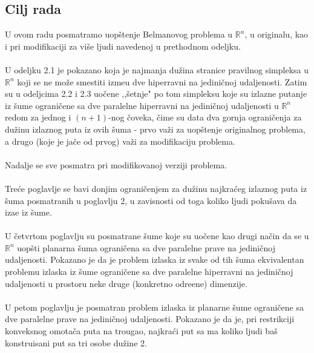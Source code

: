 \documentclass[11pt]{article}
\begin{document}
\subsection[Cilj rada]{Cilj rada}
\bigskip
U ovom radu posmatramo uop\v stenje Belmanovog problema u $\mathbb{R}^n$, u originalu, kao i pri modifikaciji za vi\v se ljudi navedenoj u prethodnom odeljku.
\\
\\
\indent U odeljku 2.1 je pokazano koja je najmanja du\v zina stranice pravilnog simpleksa u $\mathbb{R}^n$ koji se ne mo\v ze smestiti izme\dj u dve hiperravni na jedini\v cnoj udaljenosti. Zatim su u odeljcima 2.2 i 2.3  uo\v cene ,,\v setnje" po tom simpleksu koje su izlazne putanje iz \v sume ograni\v cene sa dve paralelne hiperravni na jedini\v cnoj udaljenosti u $\mathbb{R}^n$ redom za jednog i $(n+1)$-nog \v coveka, \v cime su data dva gornja ograni\v cenja za du\v zinu izlaznog puta iz ovih \v suma - prvo va\v zi za uop\v stenje originalnog problema, a drugo (koje je ja\v ce od prvog) va\v zi za modifikaciju problema. 
\\
\\
\indent Nadalje se sve posmatra pri modifikovanoj verziji problema.
\\
\\
\indent Tre\' ce poglavlje se bavi donjim ograni\v cenjem za du\v zinu najkra\' ceg izlaznog puta iz \v suma posmatranih u poglavlju 2, u zavisnosti od toga koliko ljudi poku\v sava da iza\dj e iz \v sume.
\\
\\
\indent U \v cetvrtom poglavlju su posmatrane \v sume koje su uo\v cene kao drugi na\v cin da se u $\mathbb{R}^n$ uop\v sti planarna \v suma ograni\v cena sa dve paralelne prave na jedini\v cnoj udaljenosti. Pokazano je da je problem izlaska iz svake od tih \v suma ekvivalentan problemu izlaska iz \v sume ograni\v cene sa dve paralelne hiperravni na jedini\v cnoj udaljenosti u prostoru neke druge (konkretno odre\dj ene) dimenzije.
\\
\\
\indent U petom poglavlju je posmatran problem izlaska iz planarne \v sume ograni\v cene sa dve paralelne prave na jedini\v cnoj udaljenosti. Pokazano je da je, pri restrikciji konveksnog omota\v ca puta na trougao, najkra\' ci put sa ma koliko ljudi ba\v s konstruisani put sa tri osobe du\v zine 2.
\\
\end{document}
